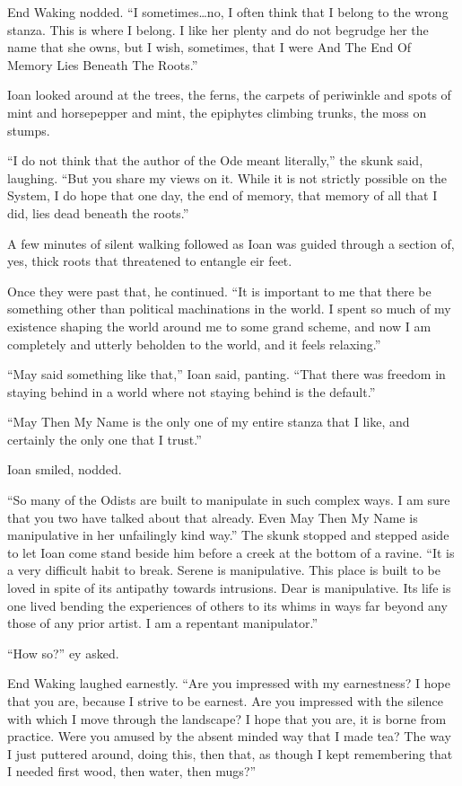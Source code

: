 End Waking nodded. ``I sometimes\ldots no, I often think that I belong to the wrong stanza. This is where I belong. I like her plenty and do not begrudge her the name that she owns, but I wish, sometimes, that I were And The End Of Memory Lies Beneath The Roots.''

Ioan looked around at the trees, the ferns, the carpets of periwinkle and spots of mint and horsepepper and mint, the epiphytes climbing trunks, the moss on stumps.

``I do not think that the author of the Ode meant literally,'' the skunk said, laughing. ``But you share my views on it. While it is not strictly possible on the System, I do hope that one day, the end of memory, that memory of all that I did, lies dead beneath the roots.''

A few minutes of silent walking followed as Ioan was guided through a section of, yes, thick roots that threatened to entangle eir feet.

Once they were past that, he continued. ``It is important to me that there be something other than political machinations in the world. I spent so much of my existence shaping the world around me to some grand scheme, and now I am completely and utterly beholden to the world, and it feels relaxing.''

``May said something like that,'' Ioan said, panting. ``That there was freedom in staying behind in a world where not staying behind is the default.''

``May Then My Name is the only one of my entire stanza that I like, and certainly the only one that I trust.''

Ioan smiled, nodded.

``So many of the Odists are built to manipulate in such complex ways. I am sure that you two have talked about that already. Even May Then My Name is manipulative in her unfailingly kind way.'' The skunk stopped and stepped aside to let Ioan come stand beside him before a creek at the bottom of a ravine. ``It is a very difficult habit to break. Serene is manipulative. This place is built to be loved in spite of its antipathy towards intrusions. Dear is manipulative. Its life is one lived bending the experiences of others to its whims in ways far beyond any those of any prior artist. I am a repentant manipulator.''

``How so?'' ey asked.

End Waking laughed earnestly. ``Are you impressed with my earnestness? I hope that you are, because I strive to be earnest. Are you impressed with the silence with which I move through the landscape? I hope that you are, it is borne from practice. Were you amused by the absent minded way that I made tea? The way I just puttered around, doing this, then that, as though I kept remembering that I needed first wood, then water, then mugs?''

